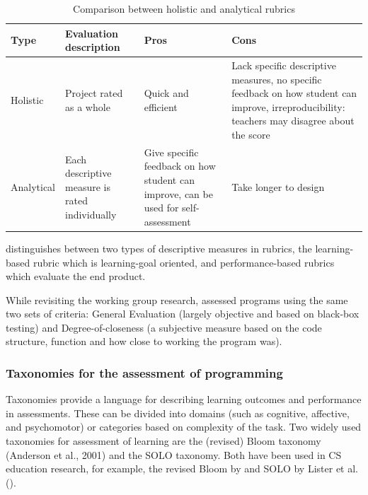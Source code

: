 \begin{table}
  \centering
\begin{tabular}{|l|l|l|l|}
  \hline
  \textbf{Type} & \textbf{Evaluation description} & \textbf{Pros} & \textbf{Cons} \\
  \hline
  Holistic & Project rated as a whole & Quick and efficient & Lack specific descriptive measures, no specific feedback on how student can improve, irreproducibility: teachers may disagree about the score \cite{catete2017framework} \\
  Analytical & Each descriptive measure is rated individually & Give specific feedback on how student can improve, can be used for self-assessment & Take longer to design \\
  \hline
\end{tabular}
\caption{Comparison between holistic and analytical rubrics}\label{table:RubricsHolisticAnalytical}
\end{table}

 distinguishes between two types of descriptive measures in rubrics, the learning-based rubric which is learning-goal oriented, and performance-based rubrics which evaluate the end product.

While revisiting the \citeauthor{McCracken2001} working group research,  assessed programs using the same two sets of criteria: General Evaluation (largely objective and
based on black-box testing) and Degree-of-closeness (a subjective measure based on the code structure, function and how close to working the program was).


\subsubsection{Taxonomies for the assessment of programming}\label{sec:taxProgramming}

Taxonomies provide a language for describing learning outcomes and performance in assessments. These can be divided into domains (such as cognitive, affective, and psychomotor) or categories based on complexity of the task. Two widely used taxonomies for assessment of learning are the (revised) Bloom taxonomy (Anderson et al., 2001) and the SOLO taxonomy. Both have been used in CS education research, for example, the revised Bloom by  and SOLO by Lister et al. (\cite{lister2006not}\cite{lister2010naturally}).

